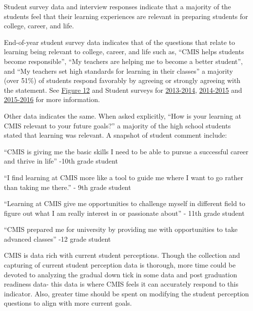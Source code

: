 \begin{findings}

Student survey data and interview responses indicate that a majority of the students feel that their learning experiences are relevant in preparing students for  college, career, and life. 

End-of-year student survey data indicates that of the questions that relate to learning being relevant to college, career, and life such as, “CMIS helps students become responsible”, “My teachers are helping me to become a better student”, and “My teachers set high standards for learning in their classes” a majority (over 51\%) of students respond favorably by agreeing or strongly agreeing with the statement.  See \href{https://docs.google.com/document/d/1DO6UYDibCyF0wjGx1Pi7tgKJYMqpfjzTcICvsf8UUWM/edit}{Figure 12} and Student surveys for  \href{https://docs.google.com/a/cmis.ac.th/forms/d/1EbMhxXKv9boAXmuwqmldZCbHKNY-aREq56IW2N-eviI/viewanalytics}{2013-2014}, \href{https://docs.google.com/a/cmis.ac.th/forms/d/1qbAnJ69O0ZRUPmBFvQaglObvnyoUkVd4hQiyaAFO7_I/viewanalytics}{2014-2015} and \href{https://docs.google.com/a/cmis.ac.th/forms/d/1n7vFCQbPQmF6pEPJKPBsu4rzdiW4KQ_DrBcjTMUbLH4/edit?ts=587d7b50#responses}{2015-2016} for more information. 

Other data indicates the same. When asked explicitly, “How is your learning at CMIS relevant to your future goals?” a majority of the high school students stated that learning was relevant.  A snapshot of student comment include: 

``CMIS is giving me the basic skills I need to be able to pursue a successful career and thrive in life'' -10th grade student
 
``I find learning at CMIS more like a tool to guide me where I want to go rather than taking me there.'' - 9th grade student 

``Learning at CMIS give me opportunities to challenge myself in different field to figure out what I am really interest in or passionate about'' - 11th grade student

``CMIS prepared me for university by  providing me with opportunities  to take advanced classes'' -12 grade student 


CMIS is data rich with current student perceptions. Though the collection and capturing of current student perception data is thorough, more time could be devoted to analyzing the gradual down tick in some data and post graduation readiness data- this data is where CMIS feels it can accurately respond to this indicator. Also, greater time should be spent on modifying the student perception questions to align with more current goals.  
\end{findings}

